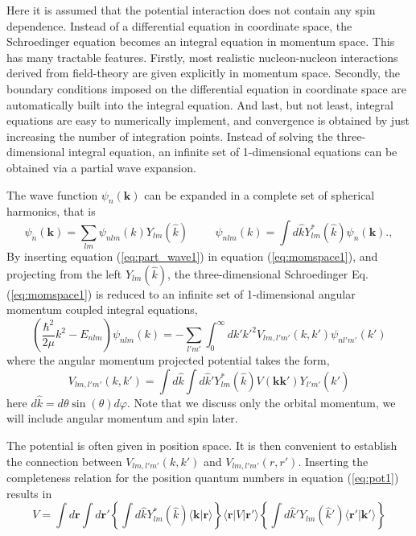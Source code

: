 \documentclass[%
oneside,                 %
final,                   %
10pt]{article}
\begin{document}
Here it is assumed that the potential interaction does not contain any spin dependence. 
Instead of a differential equation in coordinate space, the Schroedinger
equation becomes an integral equation in momentum space. This has 
many tractable features. Firstly, most realistic 
nucleon-nucleon interactions derived from field-theory are given 
explicitly in momentum space. Secondly, the boundary conditions imposed
on the differential equation in coordinate space are automatically built into the
integral equation. And last, but not least, integral equations are easy to numerically 
implement, and convergence is obtained by just increasing the number of integration
points.
Instead of solving the three-dimensional integral equation, an 
infinite set of 1-dimensional equations can be obtained via a  partial wave
expansion. 

The wave function $\psi_n(\mathbf{k})$ can be expanded in a complete set of spherical harmonics, that is
\begin{equation}
  \psi_n(\mathbf{k}) = \sum _{lm} \psi_{nlm}(k)Y_{lm}(\hat{k}) \hspace{1cm} \psi_{nlm}(k) = \int d\hat{k} Y_{lm}^*(\hat{k})\psi_n(\mathbf{k}).   , 
  \label{eq:part_wave1}
\end{equation}
By inserting equation (\ref{eq:part_wave1}) in equation (\ref{eq:momspace1}), and projecting from the left
$Y_{lm}(\hat{k})$, the three-dimensional Schroedinger Eq. (\ref{eq:momspace1}) is reduced
to an infinite set of  1-dimensional angular momentum coupled integral equations, 
\begin{equation}
  \left( \frac{\hbar^2}{2\mu} k^2-E_{nlm}\right)\psi_{nlm}(k) = -\sum_{l'm'}\int_{0}^\infty dk' {k'}^2 V_{lm, l'm'}(k,k') \psi_{nl'm'}(k') 
  \label{eq:part_wave2}
\end{equation}
where the angular momentum projected potential takes the form,
\begin{equation}
  V_{lm, l'm'}(k,k') = \int d{\hat{k}} \int d{\hat{k}'}Y_{lm}^*(\hat{k})V(\mathbf{k}\mathbf{k'})Y_{l'm'}(\hat{k}')
  \label{eq:pot1}
\end{equation}
here $d\hat{k} = d\theta\sin(\theta)d\varphi$.
Note that we discuss only the orbital momentum, we will include angular momentum and spin later. 

The potential is often given in position space. It is then convenient to establish 
the connection between $V_{lm, l'm'}(k,k')$ and $V_{lm, l'm'}(r,r')$. Inserting 
the completeness relation for the position quantum numbers in equation (\ref{eq:pot1}) results in
\begin{equation}
V =\int d\mathbf{r}\int d\mathbf{r}'\left\{\int d{\hat{k}}Y_{lm}^*(\hat{k})\langle \mathbf{k}\vert \mathbf{r}\rangle\right\}\langle\mathbf{r}\vert V\vert\mathbf{r}'\rangle\left\{\int d\hat{k}'Y_{lm}(\hat{k}')\langle\mathbf{r'}\vert\mathbf{k}'\rangle\right\}
\label{eq:pot2}
\end{equation}
\end{document}
